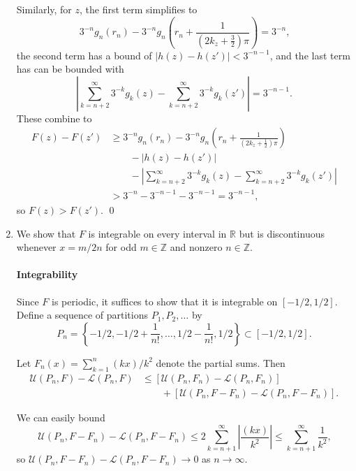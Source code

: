 \documentclass[oneside]{article}
\newcommand\abs[1]{\left|#1\right|}
\newcommand\bbR{\mathbb{R}}
\newcommand\bbZ{\mathbb{Z}}
\newcommand\calL{\mathcal{L}}
\newcommand\calU{\mathcal{U}}
\begin{document}
\begin{enumerate}[label=(\alph*)]
      Similarly, for $z$, the first term simplifies to\[
        3^{-n}g_n(r_n) - 3^{-n}g_n\left(r_n + \frac1{\left(2k_z + \frac32\right)\pi}\right)
        = 3^{-n} \text{,}
      \] the second term has a bound of $\abs{h(z) - h(z')} < 3^{-n-1}$, and the last term has can be bounded with \[
        \abs{\sum_{k=n+2}^\infty 3^{-k} g_k(z) - \sum_{k=n+2}^\infty 3^{-k} g_k(z')} = 3^{-n-1} \text{.}
      \] These combine to\begin{align*}
        F(z) - F(z')
        &\geq 3^{-n}g_n(r_n) - 3^{-n}g_n\left(r_n + \frac1{\left(2k_z + \frac12\right)\pi}\right) \\
        &\qquad - \abs{h(z) - h(z')} \\
        &\qquad - \abs{\sum_{k=n+2}^\infty 3^{-k} g_k(z) - \sum_{k=n+2}^\infty 3^{-k} g_k(z')} \\
        &> 3^{-n} - 3^{-n-1} - 3^{-n-1} = 3^{-n-1} \text{,}
      \end{align*} so $F(z) > F(z')$. \qed

    \item We show that $F$ is integrable on every interval in $\bbR$ but is discontinuous whenever $x = m/2n$ for odd $m \in \bbZ$ and nonzero $n \in \bbZ$.

    \paragraph{Integrability} Since $F$ is periodic, it suffices to show that it is integrable on $[-1/2, 1/2]$. Define a sequence of partitions $P_1, P_2, \dots$ by \[
      P_n = \left\{-1/2, -1/2 + \frac{1}{n!}, \dots, 1/2 - \frac{1}{n!}, 1/2\right\} \subset [-1/2, 1/2] \text{.}
    \]

    Let $F_n(x) = \sum_{k=1}^n (kx)/k^2$ denote the partial sums. Then \begin{align*}
      \calU(P_n, F) - \calL(P_n, F)
      &\leq \left[\calU(P_n, F_n) - \calL(P_n, F_n)\right] \\
      &\qquad+ \left[\calU(P_n, F - F_n) - \calL(P_n, F - F_n)\right] \text{.}
    \end{align*}

    We can easily bound \[
      \calU(P_n, F - F_n) - \calL(P_n, F - F_n)
      \leq 2\sum_{k=n+1}^\infty \abs{\frac{(kx)}{k^2}}
      \leq \sum_{k=n+1}^\infty \frac{1}{k^2}
      \text{,}
    \] so $\calU(P_n, F - F_n) - \calL(P_n, F - F_n) \to 0$ as $n \to \infty$.


\end{enumerate}
\end{document}
